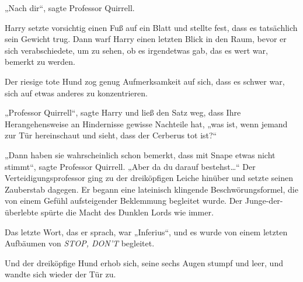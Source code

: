 „Nach dir“, sagte Professor Quirrell.

Harry setzte vorsichtig einen Fuß auf ein Blatt und stellte fest, dass es tatsächlich sein Gewicht trug. Dann warf Harry einen letzten Blick in den Raum, bevor er sich verabschiedete, um zu sehen, ob es irgendetwas gab, das es wert war, bemerkt zu werden.

Der riesige tote Hund zog genug Aufmerksamkeit auf sich, dass es schwer war, sich auf etwas anderes zu konzentrieren.

„Professor Quirrell“, sagte Harry und ließ den Satz weg, dass Ihre Herangehensweise an Hindernisse gewisse Nachteile hat, „was ist, wenn jemand zur Tür hereinschaut und sieht, dass der Cerberus tot ist?“

„Dann haben sie wahrscheinlich schon bemerkt, dass mit Snape etwas nicht stimmt“, sagte Professor Quirrell. „Aber da du darauf bestehst…“
Der Verteidigungsprofessor ging zu der dreiköpfigen Leiche hinüber und setzte seinen Zauberstab dagegen. Er begann eine lateinisch klingende Beschwörungsformel, die von einem Gefühl aufsteigender Beklemmung begleitet wurde. Der Junge-der-überlebte spürte die Macht des Dunklen Lords wie immer.

Das letzte Wort, das er sprach, war „Inferius“, und es wurde von einem letzten Aufbäumen von \emph{STOP, DON’T} begleitet.

Und der dreiköpfige Hund erhob sich, seine sechs Augen stumpf und leer, und wandte sich wieder der Tür zu.

